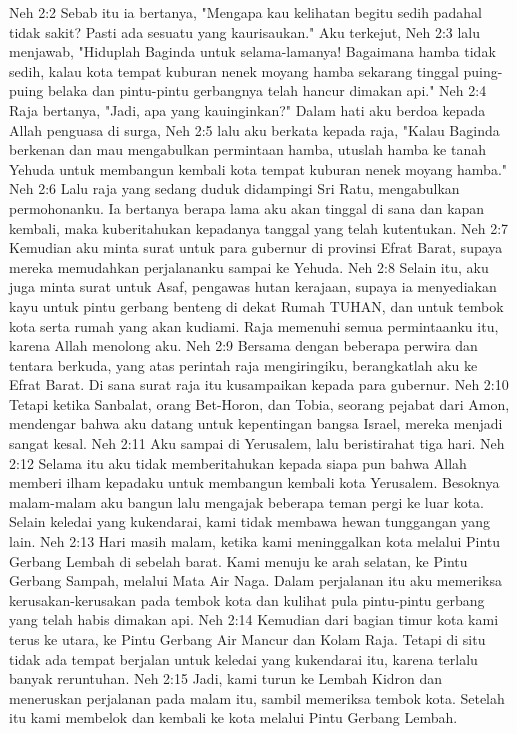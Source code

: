 Neh 2:2  Sebab itu ia bertanya, "Mengapa kau kelihatan begitu sedih padahal tidak sakit? Pasti ada sesuatu yang kaurisaukan." Aku terkejut,
Neh 2:3  lalu menjawab, "Hiduplah Baginda untuk selama-lamanya! Bagaimana hamba tidak sedih, kalau kota tempat kuburan nenek moyang hamba sekarang tinggal puing-puing belaka dan pintu-pintu gerbangnya telah hancur dimakan api."
Neh 2:4  Raja bertanya, "Jadi, apa yang kauinginkan?" Dalam hati aku berdoa kepada Allah penguasa di surga,
Neh 2:5  lalu aku berkata kepada raja, "Kalau Baginda berkenan dan mau mengabulkan permintaan hamba, utuslah hamba ke tanah Yehuda untuk membangun kembali kota tempat kuburan nenek moyang hamba."
Neh 2:6  Lalu raja yang sedang duduk didampingi Sri Ratu, mengabulkan permohonanku. Ia bertanya berapa lama aku akan tinggal di sana dan kapan kembali, maka kuberitahukan kepadanya tanggal yang telah kutentukan.
Neh 2:7  Kemudian aku minta surat untuk para gubernur di provinsi Efrat Barat, supaya mereka memudahkan perjalananku sampai ke Yehuda.
Neh 2:8  Selain itu, aku juga minta surat untuk Asaf, pengawas hutan kerajaan, supaya ia menyediakan kayu untuk pintu gerbang benteng di dekat Rumah TUHAN, dan untuk tembok kota serta rumah yang akan kudiami. Raja memenuhi semua permintaanku itu, karena Allah menolong aku.
Neh 2:9  Bersama dengan beberapa perwira dan tentara berkuda, yang atas perintah raja mengiringiku, berangkatlah aku ke Efrat Barat. Di sana surat raja itu kusampaikan kepada para gubernur.
Neh 2:10  Tetapi ketika Sanbalat, orang Bet-Horon, dan Tobia, seorang pejabat dari Amon, mendengar bahwa aku datang untuk kepentingan bangsa Israel, mereka menjadi sangat kesal.
Neh 2:11  Aku sampai di Yerusalem, lalu beristirahat tiga hari.
Neh 2:12  Selama itu aku tidak memberitahukan kepada siapa pun bahwa Allah memberi ilham kepadaku untuk membangun kembali kota Yerusalem. Besoknya malam-malam aku bangun lalu mengajak beberapa teman pergi ke luar kota. Selain keledai yang kukendarai, kami tidak membawa hewan tunggangan yang lain.
Neh 2:13  Hari masih malam, ketika kami meninggalkan kota melalui Pintu Gerbang Lembah di sebelah barat. Kami menuju ke arah selatan, ke Pintu Gerbang Sampah, melalui Mata Air Naga. Dalam perjalanan itu aku memeriksa kerusakan-kerusakan pada tembok kota dan kulihat pula pintu-pintu gerbang yang telah habis dimakan api.
Neh 2:14  Kemudian dari bagian timur kota kami terus ke utara, ke Pintu Gerbang Air Mancur dan Kolam Raja. Tetapi di situ tidak ada tempat berjalan untuk keledai yang kukendarai itu, karena terlalu banyak reruntuhan.
Neh 2:15  Jadi, kami turun ke Lembah Kidron dan meneruskan perjalanan pada malam itu, sambil memeriksa tembok kota. Setelah itu kami membelok dan kembali ke kota melalui Pintu Gerbang Lembah.
